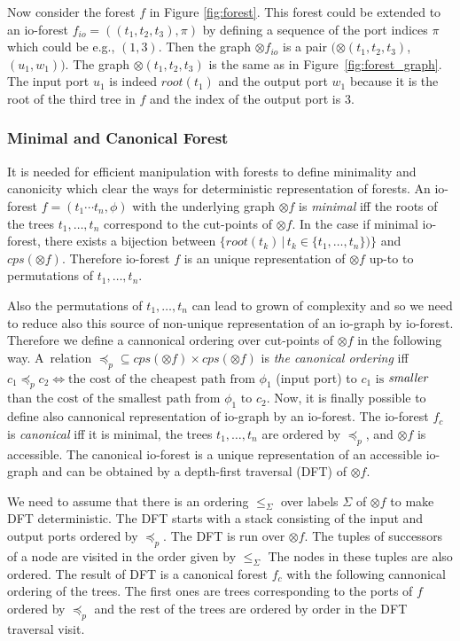 \documentclass[a4paper, 12pt]{article}
\begin{document}
Now consider the forest $f$ in Figure \ref{fig:forest}.
This forest could be extended to an io-forest $f_{io}=((t_1,t_2,t_3),\pi)$ 
by defining a sequence of the port indices $\pi$ which could be e.g., $(1,3)$.
Then the graph $\otimes f_{io}$ is a pair $(\otimes (t_1,t_2,t_3)$, $(u_1,w_1))$.
The graph $\otimes (t_1,t_2,t_3)$ is the same as in Figure~\ref{fig:forest_graph}.
The input port $u_1$ is indeed $root(t_1)$
and the output port $w_1$ because it is the root of the third tree in $f$
and the index of the output port is $3$.
\label{ex:iograph}
\eexmp

\subsubsection{Minimal and Canonical Forest}
\label{subsec:mcforest}

It is needed for efficient manipulation with forests to define minimality and
canonicity which clear the ways for deterministic representation of forests.
An io-forest $f=(t_1 \cdots t_n, \phi)$ with the underlying graph $\otimes f$ is \emph{minimal}
iff the roots of the trees $t_1,\ldots,t_n$ correspond to the cut-points of $\otimes f$.
In the case if minimal io-forest, there exists a bijection between
$\{root(t_k)\,|\, t_k \in \{t_1, \ldots, t_n\} )\}$ and $cps(\otimes f)$.
Therefore io-forest $f$ is an unique representation of $\otimes f$ up-to to permutations of $t_1,\ldots,t_n$.

Also the permutations of $t_1,\ldots,t_n$ can lead to grown of complexity and so
we need to reduce also this source of non-unique representation of an io-graph by io-forest.
Therefore we define a cannonical ordering over cut-points of $\otimes f$ in the following way.
A~relation ${\preceq_p} \subseteq {cps(\otimes f) \times cps(\otimes f)}$ is \emph{the canonical ordering}
iff $c_1 \preceq_p c_2 \Leftrightarrow \text{the cost of the cheapest path from }
\phi_1$ (input port) to $c_1 \text{ is}$ $\emph{smaller}$ $\text{than the cost of the smallest path from } \phi_1 \text{ to } c_2$.
Now, it is finally possible to define also cannonical representation of io-graph by an io-forest.
The io-forest $f_c$ is \emph{canonical} iff it is minimal, the trees $t_1,\ldots, t_n$ are ordered by $\preceq_p$, and $\otimes f$ is accessible.
The canonical io-forest is a unique representation of an accessible io-graph
and can be obtained by a depth-first traversal (DFT) of $\otimes f$.

We need to assume that there is an ordering $\leq_\Sigma$ over labels $\Sigma$ of $\otimes f$
to make DFT deterministic.
The DFT starts with a stack consisting of the input and output ports ordered by $\preceq_p$.
The DFT is run over $\otimes f$.
The tuples of successors of a node are visited in the order given by $\leq_{\Sigma}$
The nodes in these tuples are also ordered.
The result of DFT is a canonical forest $f_c$ with the following
cannonical ordering of the trees.
The first ones are trees corresponding to the ports of $f$ ordered by $\preceq_p$ and
the rest of the trees are ordered by order in the DFT traversal visit.
\end{document}
